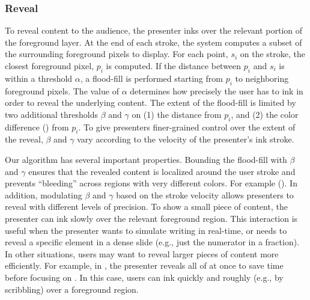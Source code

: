 \subsubsection{Reveal}
To reveal content to the audience, the presenter inks over the relevant portion of the foreground layer.
%
At the end of each stroke, the system computes a subset of the surrounding foreground pixels to display. 
%
For each point, $s_i$ on the stroke, the closest foreground pixel, $p_i$ is computed. If the distance between $p_i$ and $s_i$ is within a threshold $\alpha$, a flood-fill is performed starting from $p_i$ to neighboring foreground pixels. The value of $\alpha$ determines how precisely the user has to ink in order to reveal the underlying content. 
%
The extent of the flood-fill is limited by two additional thresholds $\beta$ and $\gamma$ on (1) the distance from $p_i$, and (2) the color difference () from $p_i$. 
%
To give presenters finer-grained control over the extent of the reveal, $\beta$ and $\gamma$ vary according to the velocity of the presenter's ink stroke.  

Our algorithm has several important properties. Bounding the flood-fill with $\beta$ and $\gamma$ ensures that the revealed content is localized around the user stroke and prevents ``bleeding'' across regions with very different colors. For example (). 
%
In addition, modulating $\beta$ and $\gamma$ based on the stroke velocity allows presenters to reveal with different levels of precision. 
%
To show a small piece of content, the presenter can ink slowly over the relevant foreground region. This interaction is useful when the presenter wants to simulate writing in real-time, or needs to reveal a specific element in a dense slide (e.g., just the numerator in a fraction). 
%
In other situations, users may want to reveal larger pieces of content more efficiently. For example, in , the presenter reveals all of  at once to save time before focusing on . In this case, users can ink quickly and roughly (e.g., by scribbling) over a foreground region.


